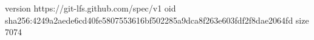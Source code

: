 version https://git-lfs.github.com/spec/v1
oid sha256:4249a2aede6cd40fe5807553616bf502285a9dca8f263e603fdf2f8dae2064fd
size 7074
